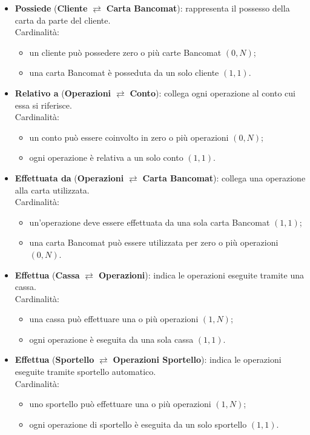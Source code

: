 \begin{itemize}
  \item \textbf{Possiede} (\textbf{Cliente} $\rightleftarrows$ \textbf{Carta Bancomat}): rappresenta il possesso della carta da parte del cliente.\\
  Cardinalità:
  \begin{itemize}
    \item un cliente può possedere zero o più carte Bancomat \((0,N)\);
    \item una carta Bancomat è posseduta da un solo cliente \((1,1)\).
  \end{itemize}

  \item \textbf{Relativo a} (\textbf{Operazioni} $\rightleftarrows$ \textbf{Conto}): collega ogni operazione al conto cui essa si riferisce.\\
  Cardinalità:
  \begin{itemize}
    \item un conto può essere coinvolto in zero o più operazioni \((0,N)\);
    \item ogni operazione è relativa a un solo conto \((1,1)\).
  \end{itemize}

  \item \textbf{Effettuata da} (\textbf{Operazioni} $\rightleftarrows$ \textbf{Carta Bancomat}): collega una operazione alla carta utilizzata.\\
  Cardinalità:
  \begin{itemize}
    \item un'operazione deve essere effettuata da una sola carta Bancomat \((1,1)\);
    \item una carta Bancomat può essere utilizzata per zero o più operazioni \((0,N)\).
  \end{itemize}

  \item \textbf{Effettua} (\textbf{Cassa} $\rightleftarrows$ \textbf{Operazioni}): indica le operazioni eseguite tramite una cassa.\\
  Cardinalità:
  \begin{itemize}
    \item una cassa può effettuare una o più operazioni \((1,N)\);
    \item ogni operazione è eseguita da una sola cassa \((1,1)\).
  \end{itemize}

  \item \textbf{Effettua} (\textbf{Sportello} $\rightleftarrows$ \textbf{Operazioni Sportello}): indica le operazioni eseguite tramite sportello automatico.\\
  Cardinalità:
  \begin{itemize}
    \item uno sportello può effettuare una o più operazioni \((1,N)\);
    \item ogni operazione di sportello è eseguita da un solo sportello \((1,1)\).
  \end{itemize}


\end{itemize}
